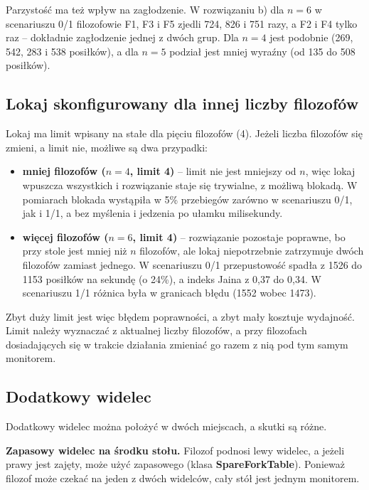 \documentclass[11pt,a4paper]{article}
\begin{document}
Parzystość ma też wpływ na zagłodzenie. W rozwiązaniu b) dla $n = 6$ w scenariuszu 0/1 filozofowie
F1, F3 i F5 zjedli 724, 826 i 751 razy, a F2 i F4 tylko raz -- dokładnie zagłodzenie jednej z dwóch
grup. Dla $n = 4$ jest podobnie (269, 542, 283 i 538 posiłków), a dla $n = 5$ podział jest mniej wyraźny
(od 135 do 508 posiłków).

\subsection{Lokaj skonfigurowany dla innej liczby filozofów}
\label{sec:waiter-limit}
Lokaj ma limit wpisany na stałe dla pięciu filozofów (4). Jeżeli liczba filozofów się zmieni,
a limit nie, możliwe są dwa przypadki:
\begin{itemize}
    \item \textbf{mniej filozofów ($n = 4$, limit 4)} -- limit nie jest mniejszy od $n$, więc lokaj
          wpuszcza wszystkich i rozwiązanie staje się trywialne, z możliwą blokadą.
          W pomiarach blokada wystąpiła w 5\% przebiegów zarówno w scenariuszu 0/1, jak i 1/1,
          a bez myślenia i jedzenia po ułamku milisekundy.
    \item \textbf{więcej filozofów ($n = 6$, limit 4)} -- rozwiązanie pozostaje poprawne, bo przy stole
          jest mniej niż $n$ filozofów, ale lokaj niepotrzebnie zatrzymuje dwóch filozofów zamiast jednego.
          W scenariuszu 0/1 przepustowość spadła z 1526 do 1153 posiłków na sekundę (o 24\%),
          a indeks Jaina z 0,37 do 0,34. W scenariuszu 1/1 różnica była w granicach błędu (1552 wobec 1473).
\end{itemize}
Zbyt duży limit jest więc błędem poprawności, a zbyt mały kosztuje wydajność.
Limit należy wyznaczać z aktualnej liczby filozofów, a przy filozofach dosiadających się
w trakcie działania zmieniać go razem z nią pod tym samym monitorem.

\subsection{Dodatkowy widelec}
Dodatkowy widelec można położyć w dwóch miejscach, a skutki są różne.

\textbf{Zapasowy widelec na środku stołu.} Filozof podnosi lewy widelec, a jeżeli prawy jest zajęty,
może użyć zapasowego (klasa \textbf{SpareForkTable}). Ponieważ filozof może czekać na jeden z dwóch
widelców, cały stół jest jednym monitorem.
\end{document}
